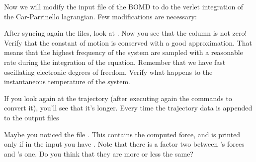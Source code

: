 \documentclass[landscape]{foils}
\begin{document}

Now we will modify the input file of the BOMD to do the verlet integration of the Car-Parrinello lagrangian. Few modifications are necessary:

After syncing again the files, look at . Now you see that the  column is not zero! Verify that the constant of motion is conserved with a good approximation. That means that the highest frequency of the system are sampled with a reasonable rate during the integration of the equation. Remember that we have fast oscillating electronic degrees of freedom. Verify what happens to the instantaneous temperature of the system.


If you look again at the trajectory (after executing again the commands to convert it), you'll see that it's longer. Every time the trajectory data is appended to the output files 

Maybe you noticed the file . This contains the computed force, and is printed only if in the input you have . Note that there is a factor two between 's forces and 's one. Do you think that they are more or less the same?
\end{document}
